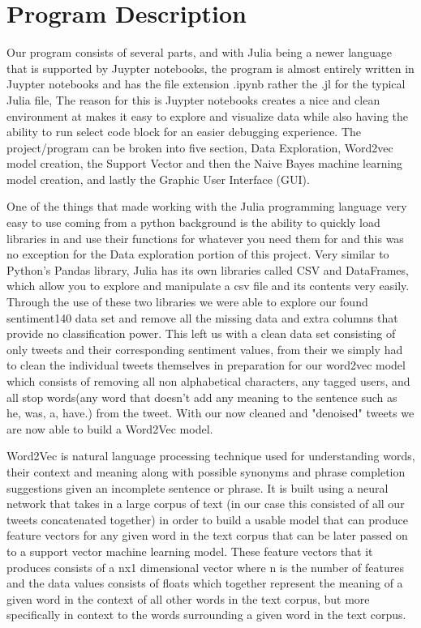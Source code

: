 \documentclass{article}
\begin{document}
\section{Program Description}
Our program consists of several parts, and with Julia being a newer language that is supported by Juypter notebooks, the program is almost entirely written in Juypter notebooks and has the file extension .ipynb rather the .jl for the typical Julia file, The reason for this is Juypter notebooks creates a nice and clean environment at makes it easy to explore and visualize data while also having the ability to run select code block for an easier debugging experience. The project/program can be broken into five section, Data Exploration, Word2vec model creation, the Support Vector and then the Naive Bayes machine learning model creation, and lastly the Graphic User Interface (GUI). 

One of the things that made working with the Julia programming language very easy to use coming from a python background is the ability to quickly load libraries in and use their functions for whatever you need them for and this was no exception for the Data exploration portion of this project. Very similar to Python's Pandas library, Julia has its own libraries called CSV and DataFrames, which allow you to explore and manipulate a csv file and its contents very easily. Through the use of these two libraries we were able to explore our found sentiment140 data set and remove all the missing data and extra columns that provide no classification power. This left us with a clean data set consisting of only tweets and their corresponding sentiment values, from their we simply had to clean the individual tweets themselves in preparation for our word2vec model which consists of removing all non alphabetical characters, any tagged users, and all stop words(any word that doesn't add any meaning to the sentence such as he, was, a, have.) from the tweet. With our now cleaned and "denoised" tweets we are now able to build a Word2Vec model. 

Word2Vec is natural language processing technique used for understanding words, their context and meaning along with possible synonyms and phrase completion suggestions given an incomplete sentence or phrase. It is built using a neural network that takes in a large corpus of text (in our case this consisted of all our tweets concatenated together) in order to build a usable model that can produce feature vectors for any given word in the text corpus that can be later passed on to a support vector machine learning model. These feature vectors that it produces consists of a nx1 dimensional vector where n is the number of features and the data values consists of floats which together represent the meaning of a given word in the context of all other words in the text corpus, but more specifically in context to the words surrounding a given word in the text corpus.
\end{document}
